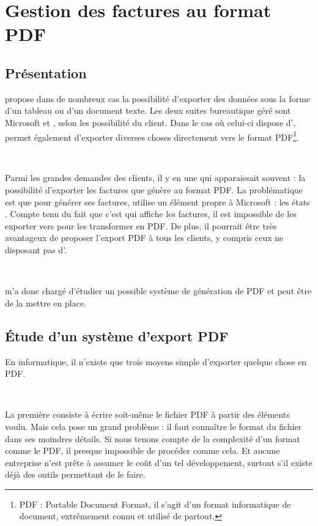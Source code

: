 \chapter{Gestion des factures au format PDF}
\section{Présentation}
\integrale propose dans de nombreux cas la possibilité d'exporter des données sous la forme d'un tableau ou d'un document texte. Les deux suites bureautique géré sont Microsoft  et , selon les possibilité du client. Dans le cas où celui-ci dispose d', \integrale{} permet également d'exporter diverses choses directement vers le format PDF\footnote{PDF : Portable Document Format, il s'agit d'un format informatique de document, extrêmement connu et utilisé de partout.}.

~

Parmi les grandes demandes des clients, il y en une qui apparaissait souvent : la possibilité d'exporter les factures que génère \integrale{} au format PDF. La problématique est que pour générer ses factures, \solulog{} utilise un élément propre à Microsoft  : les \og états \fg. Compte tenu du fait que c'est  qui affiche les factures, il est impossible de les exporter vers  pour les transformer en PDF. De plus, il pourrait être très avantageux de proposer l'export PDF à tous les clients, y compris ceux ne disposant pas d'.

~

\solulog{} m'a donc chargé d'étudier un possible système de génération de PDF et peut être de la mettre en place.

\section{Étude d'un système d'export PDF}
En informatique, il n'existe que trois moyens \og simple \fg{} d'exporter quelque chose en PDF.

~

La première consiste à écrire soit-même le fichier PDF à partir des éléments voulu. Mais cela pose un grand problème : il faut connaître le format du fichier dans ses moindres détails. Si nous tenons compte de la complexité d'un format comme le PDF, il presque impossible de procéder comme cela. Et aucune entreprise n'est prête à assumer le coût d'un tel développement, surtout s'il existe déjà des outils permettant de le faire.

